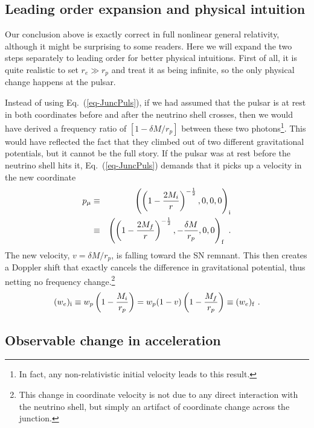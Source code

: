 \documentclass[aps,showpacs,onecolumn,floats,prd,superscriptaddress,nofootinbib]{revtex4}
\begin{document}
\subsection{Leading order expansion and physical intuition}

Our conclusion above is exactly correct in full nonlinear general relativity, although it might be surprising to some readers. Here we will expand the two steps separately to leading order for better physical intuitions. First of all, it is quite realistic to set $r_e \gg r_p$ and treat it as being infinite, so the only physical change happens at the pulsar.

Instead of using Eq.~(\ref{eq-JuncPuls}), if we had assumed that the pulsar is at rest in both coordinates before and after the neutrino shell crosses, then we would have derived a frequency ratio of $[1-\delta M/r_p]$ between these two photons\footnote{In fact, any non-relativistic initial velocity leads to this result.}. This would have reflected the fact that they climbed out of two different gravitational potentials, but it cannot be the full story. If the pulsar was at rest before the neutrino shell hits it, Eq.~(\ref{eq-JuncPuls}) demands that it picks up a velocity in the new coordinate
 \begin{eqnarray}
p_\mu &\equiv& \left( \left( 1 - \frac{2M_i}{r} \right)^{-\frac{1}{2}}, 0, 0,0\right)_{\rm i} 
\label{eq-PulsarRest} \\ \nonumber  &\equiv&	
\left( \left( 1 - \frac{2M_f}{r} \right)^{-\frac{1}{2}}, -\frac{\delta M}{r_p},0,0 \right)_{\rm f}~.
\end{eqnarray}
The new velocity, $v=\delta M/r_p$, is falling toward the SN remnant. This then creates a Doppler shift that exactly cancels the difference in gravitational potential, thus netting no frequency change.\footnote{This change in coordinate velocity is not due to any direct interaction with the neutrino shell, but simply an artifact of coordinate change across the junction.}
\begin{equation}
(w_e)_{\rm i} \equiv w_p \left(1-\frac{M_i}{r_p}\right) = 
w_p (1-v)\left(1-\frac{M_f}{r_p}\right) \equiv (w_e)_{\rm f}~.
\label{eq-leading}
\end{equation}

\subsection{Observable change in acceleration}
\label{sec-acceleration}
\end{document}
